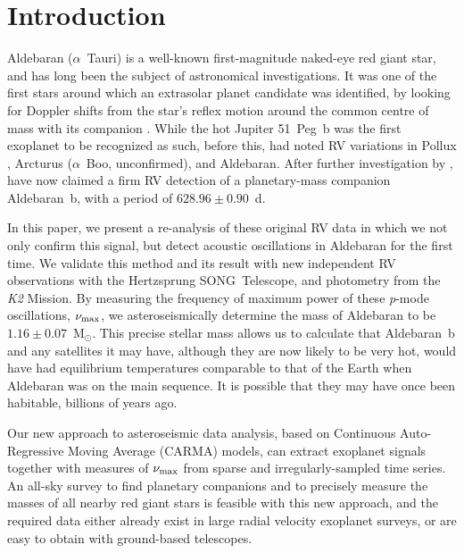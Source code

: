 \documentclass[modern]{aastex61}
\newcommand{\numax}{\mbox{$\nu_{\rm max}$}\xspace}
\newcommand{\msun}{\mbox{$\mathrm{M}_{\odot}$}\xspace}
\newcommand{\ktwo}{\emph{K2}\xspace}
\begin{document}
\section{Introduction}

Aldebaran ($\alpha$~Tauri) is a well-known first-magnitude naked-eye red giant star, and has long been the subject of astronomical investigations. It was one of the first stars around which an extrasolar planet candidate was identified, by looking for Doppler shifts from the star's reflex motion around the common centre of mass with its companion \citep[the radial velocity or RV method;][]{struverv}. While the hot Jupiter 51~Peg~b \citep{51peg} was the first exoplanet to be recognized as such, before this, \citet{hatzes1993} had noted RV variations in Pollux \citep[$\beta$~Gem; subsequently confirmed as a planet:][]{betgemconf,betgemconf2}, Arcturus ($\alpha$~Boo, unconfirmed), and Aldebaran. After further investigation by \citet{Hatzes1998}, \citet{Hatzes2015} have now claimed a firm RV detection of a planetary-mass companion Aldebaran~b, with a period of $628.96 \pm 0.90$~d.

In this paper, we present a re-analysis of these original RV data in which we not only confirm this signal, but detect acoustic oscillations in Aldebaran for the first time. We validate this method and its result with new independent RV observations with the Hertzsprung SONG~Telescope, and photometry from the \ktwo Mission. By measuring the frequency of maximum power of these \emph{p}-mode oscillations, \numax, we asteroseismically determine the mass of Aldebaran to be $1.16 \pm 0.07$~\msun. This precise stellar mass allows us to calculate that Aldebaran~b and any satellites it may have, although they are now likely to be very hot, would have had equilibrium temperatures comparable to that of the Earth when Aldebaran was on the main sequence. It is possible that they may have once been habitable, billions of years ago.

Our new approach to asteroseismic data analysis, based on Continuous Auto-Regressive Moving Average (CARMA) models, can extract exoplanet signals together with measures of \numax from sparse and irregularly-sampled time series. An all-sky survey to find planetary companions and to precisely measure the masses of all nearby red giant stars is feasible with this new approach, and the required data either already exist in large radial velocity exoplanet surveys, or are easy to obtain with ground-based telescopes.
\end{document}
